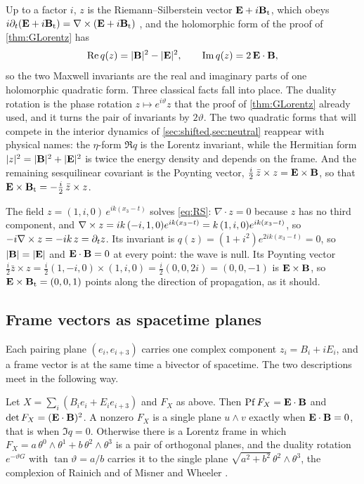 Up to a factor $i$, $z$ is the Riemann--Silberstein vector $\mathbf E+i\mathbf B_{\rm t}$, which obeys
$i\partial_t(\mathbf E+i\mathbf B_{\rm t})=\nabla\times(\mathbf E+i\mathbf B_{\rm t})$ \cite{Silberstein1907,BialynickiBirula13}, and the holomorphic form of the proof of
\cref{thm:GLorentz} has
\[
\operatorname{Re} q(z)=|\mathbf B|^2-|\mathbf E|^2,\qquad \operatorname{Im} q(z)=2\,\mathbf E\cdot\mathbf B ,
\]
so the two Maxwell invariants are the real and imaginary parts of one holomorphic quadratic form. Three classical facts fall into
place. The duality rotation is the phase rotation $z\mapsto e^{i\vartheta}z$ that the proof of \cref{thm:GLorentz} already used, and
it turns the pair of invariants by $2\vartheta$. The two quadratic forms that will compete in the interior dynamics of
\cref{sec:shifted,sec:neutral} reappear with physical names: the $\eta$-form $\Re q$ is the Lorentz invariant, while the Hermitian
form $|z|^2=|\mathbf B|^2+|\mathbf E|^2$ is twice the energy density and depends on the frame. And the remaining sesquilinear covariant is the
Poynting vector, $\tfrac i2\,\bar z\times z=\mathbf E\times\mathbf B$, so that $\mathbf E\times\mathbf B_{\rm t}=-\tfrac i2\,\bar z\times z$.

\begin{example}
\label{ex:circular}
The field $z=(1,i,0)\,e^{ik(x_3-t)}$ solves \eqref{eq:RS}: $\nabla\cdot z=0$ because $z$ has no third component, and
$\nabla\times z=ik\,(-i,1,0)e^{ik(x_3-t)}=k\,(1,i,0)e^{ik(x_3-t)}$, so $-i\nabla\times z=-ik\,z=\partial_tz$. Its invariant is
$q(z)=(1+i^2)e^{2ik(x_3-t)}=0$, so $|\mathbf B|=|\mathbf E|$ and $\mathbf E\cdot\mathbf B=0$ at every point: the wave is null. Its Poynting vector
$\tfrac i2\bar z\times z=\tfrac i2(1,-i,0)\times(1,i,0)=\tfrac i2(0,0,2i)=(0,0,-1)$ is $\mathbf E\times\mathbf B$, so $\mathbf E\times\mathbf B_{\rm t}=(0,0,1)$
points along the direction of propagation, as it should.
\end{example}

\subsection{Frame vectors as spacetime planes}

Each pairing plane $(e_i,e_{i+3})$ carries one complex component $z_i=B_i+iE_i$, and a frame vector is at the same time a bivector of
spacetime. The two descriptions meet in the following way.

\begin{proposition}
\label{prop:planes}
Let $X=\sum_i(B_ie_i+E_ie_{i+3})$ and $F_X$ as above. Then $\operatorname{Pf} F_X=\mathbf E\cdot\mathbf B$ and $\det F_X=(\mathbf E\cdot\mathbf B)^2$. A nonzero $F_X$ is a
single plane $u\wedge v$ exactly when $\mathbf E\cdot\mathbf B=0$, that is when $\Im q=0$. Otherwise there is a Lorentz frame in which
$F_X=a\,\theta^0\wedge\theta^1+b\,\theta^2\wedge\theta^3$ is a pair of orthogonal planes, and the duality rotation $e^{-\vartheta G}$ with
$\tan\vartheta=a/b$ carries it to the single plane $\sqrt{a^2+b^2}\,\theta^2\wedge\theta^3$, the complexion of Rainich and of Misner
and Wheeler \cite{Rainich1925,MisnerWheeler57}.
\end{proposition}


